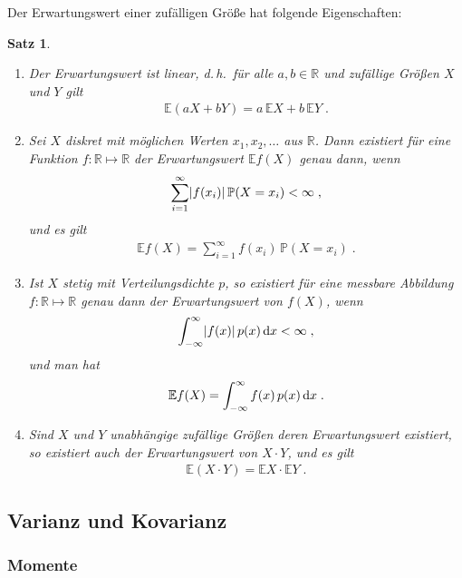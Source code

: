 \documentclass[ngerman,draft,parskip=half,twoside]{scrartcl}
\newtheorem{thm}{Satz}[section]
\DeclarePairedDelimiter{\abs}{\lvert}{\rvert}
\newcommand*{\R}{\mathbb{R}}      %
\newcommand*{\E}{\mathbb{E}}        %
\newcommand*{\WKM}{\mathbb{P}}      %
\newcommand*{\diff}[1]{%
  \mathop{\mathrm{\mathstrut d}}%
  \ifx#1(\else%
  \ifx#1[\else%
  \ifx#1\{\else%
    \!%
  \fi\fi\fi#1%
}
\begin{document}
Der Erwartungswert einer zufälligen Größe hat folgende Eigenschaften:
\begin{thm}~
  \begin{enumerate}
   \item Der Erwartungswert ist linear, d.\,h.~für alle $a,b\in\R$ und
    zufällige Größen $X$ und $Y$ gilt
    \begin{gather*}
      \E(a X+ b Y) = a\,\E X + b\, \E Y\;.
    \end{gather*}

   \item Sei $X$ diskret mit möglichen Werten $x_1,x_2,\dotsc$ aus $\R$. Dann
    existiert für eine Funktion $f \colon\R\mapsto\R$ der Erwartungswert $\E
    f(X)$ genau dann, wenn
    \begin{gather*}
      \sum_{i=1}^\infty \abs{f(x_i)}\,\WKM(X=x_i)<\infty\;,
    \end{gather*}
    und es gilt
    \begin{gather*}
      \E f(X)=\sum_{i=1}^\infty f(x_i)\,\WKM(X=x_i)\;.
    \end{gather*}

   \item Ist $X$ stetig mit Verteilungsdichte $p$, so existiert für eine
    messbare Abbildung $f \colon\R\mapsto\R$ genau dann der Erwartungswert von
    $f(X)$, wenn
    \begin{gather*}
      \int_{-\infty}^\infty \abs{f(x)}\,p(x)\diff{x}<\infty\;,
    \end{gather*}
    und man hat
    \begin{gather*}
      \E f(X)=\int_{-\infty}^\infty  f(x) \,p(x)\diff{x}\;.
    \end{gather*}

   \item Sind $X$ und $Y$ unabhängige zufällige Größen deren Erwartungswert
    existiert, so existiert auch der Erwartungswert von $X\cdot Y$, und es gilt
    \begin{gather*}
      \E(X\cdot Y)= \E X \cdot \E Y\;.
    \end{gather*}
  \end{enumerate}
\end{thm}

\subsection{Varianz und Kovarianz}
\subsubsection{Momente}
\end{document}
